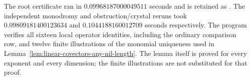 \begin{remark}
\label{rem:nonordinary-ppav-covector-checks}
The root certificate ran in $0.09968187000049511$ seconds and is retained
as .
The independent monodromy and obstruction/crystal reruns took
$0.09809181400123634$ and $0.1044188160012709$ seconds respectively.
The program verifies all sixteen local operator identities, including
the ordinary comparison row, and twelve finite illustrations of the
monomial uniqueness used in
Lemma~\ref{lem:linear-covectors-any-nil-length}.
The lemma itself is proved for every exponent and every dimension;
the finite illustrations are not substituted for that proof.
\end{remark}
